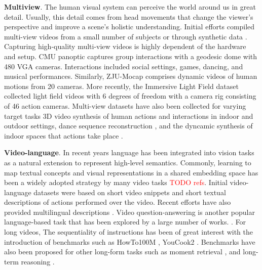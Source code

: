 \documentclass[smallextended,twocolumn,natbib]{svjour3}
\begin{document}
\noindent
\textbf{Multiview}. The human visual system can perceive the world around us in great detail. Usually, this detail comes from head movements that change the viewer's perspective and improve a scene's holistic understanding. 
Initial efforts compiled multi-view videos from a small number of subjects \citep{sigal2010humaneva} or through synthetic data \citep{ionescu2013human3}. Capturing high-quality multi-view videos is highly dependent of the hardware and setup. CMU panoptic \citep{joo2017panoptic} captures group interactions with a geodesic dome with 480 VGA cameras. Interactions included social settings, games, dancing, and musical performances. Similarly, ZJU-Mocap \citep{peng2021neural} comprises dynamic videos of human motions from 20 cameras. More recently, the Immersive Light Field dataset \citep{broxton2020immersive} collected light field videos with 6 degrees of freedom with a camera rig consisting of 46 action cameras. Multi-view datasets have also been collected for varying target tasks 3D video synthesis of human actions and interactions in indoor \citep{li2022neural} and outdoor \citep{lin2021deep,yoon2020novel} settings, dance sequence reconstruction \citep{tsuchida2019aist}, and the dyncamic synthesis of indoor spaces that actions take place \citep{tschernezki2024epic}.

\noindent
\textbf{Video-language}. In recent years language has been integrated into vision tasks as a natural extension to represent high-level semantics. Commonly, learning to map textual concepts and visual representations in a shared embedding space has been a widely adopted strategy by many video tasks \textcolor{red}{TODO refs}. Initial video-language datasets \citep{chen2011collecting,xu2016msr} were based on short video snippets and short textual descriptions of actions performed over the video. Recent efforts have also provided multilingual descriptions \citep{wang2019vatex}. Video question-answering is another popular language-based task that has been explored by a large number of works. \citep{jang2017tgif,lei2018tvqa,li2024mvbench,oncescu2021queryd,xiao2021next}. For long videos, The sequentiality of instructions has been of great interest with the introduction of benchmarks such as HowTo100M \citep{miech2019howto100m}, YouCook2 \citep{zhou2018towards}. Benchmarks have also been proposed for other long-form tasks such as moment retrieval \citep{song2024moviechat,yang2024vidchapters}, and long-term reasoning \citep{mangalam2023egoschema}.
\end{document}
